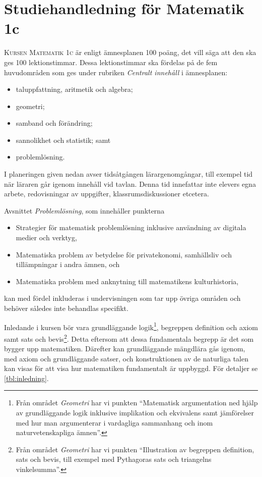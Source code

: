 \chapter{Studiehandledning för Matematik 1c}\label{Studiehandledning}

\lettrine{K}{ursen Matematik 1c}
är enligt ämnesplanen 100 poäng, det vill säga att den ska ges 100 
lektionstimmar.
Dessa lektionstimmar ska fördelas på de fem huvudområden som ges under rubriken
\emph{Centralt innehåll} i ämnesplanen: 
\begin{itemize}
  \item taluppfattning, aritmetik och algebra;
  \item geometri;
  \item samband och förändring;
  \item sannolikhet och statistik; samt
  \item problemlösning.
\end{itemize}

I planeringen given nedan avser tidsåtgången lärargenomgångar, till exempel
tid när läraren går igenom innehåll vid tavlan.
Denna tid innefattar inte elevers egna arbete, redovisningar av uppgifter,
klassrumsdiskussioner etcetera.

Avsnittet \emph{Problemlösning}, som innehåller punkterna
\begin{itemize}
  \item Strategier för matematisk problemlösning inklusive användning av
    digitala medier och verktyg,
  \item Matematiska problem av betydelse för privatekonomi, samhällsliv och
    tillämpningar i andra ämnen, och
  \item Matematiska problem med anknytning till matematikens kulturhistoria,
\end{itemize}
kan med fördel inkluderas i undervisningen som tar upp övriga områden och
behöver således inte behandlas specifikt.

Inledande i kursen bör vara grundläggande logik\footnote{%
  Från området \emph{Geometri} har vi punkten \enquote{Matematisk argumentation 
    ned hjälp av grundläggande logik inklusive implikation och ekvivalens samt 
    jämförelser med hur man argumenterar i vardagliga sammanhang och inom 
    naturvetenskapliga ämnen}.
}, begreppen definition och axiom samt sats och bevis\footnote{%
  Från området \emph{Geometri} har vi punkten \enquote{Illustration av 
    begreppen definition, sats och bevis, till exempel med Pythagoras sats och 
    triangelns vinkelsumma}.
}.
Detta eftersom att dessa fundamentala begrepp är det som bygger upp
matematiken.
Därefter kan grundläggande mängdlära gås igenom, med axiom och grundläggande
satser, och konstruktionen av de naturliga talen kan visas för att visa hur
matematiken fundamentalt är uppbyggd.
För detaljer se \cref{tbl:inledning}.

